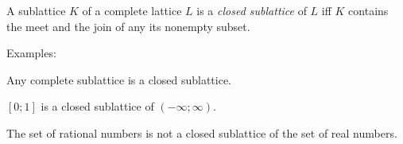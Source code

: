 \documentclass[12pt]{article}
\begin{document}
A sublattice $K$ of a complete lattice $L$ is a \emph{closed sublattice} of $L$ iff $K$ contains the meet and the join of any its nonempty subset.

Examples:

Any complete sublattice is a closed sublattice.

$[0;1]$ is a closed sublattice of $(-\infty;\infty)$.

The set of rational numbers is not a closed sublattice of the set of real numbers.
\end{document}
